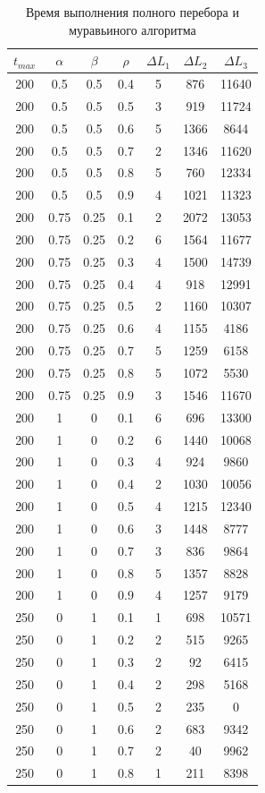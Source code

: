 \documentclass[a4paper,oneside,14pt]{extreport}
\begin{document}
\begin{table}[H]
\begin{center}
	\caption[]{\label{tbl:only} Время выполнения полного перебора и муравьиного алгоритма}
	\begin{tabular}{|c|c|c|c|c|c|c|}
		\hline
		$t_{max}$ & $\alpha$ & $\beta$&$\rho$ &$\Delta L_{1}$ & $\Delta L_{2}$ & $\Delta L_{3}$\\
		\hline
		200 & 0.5 & 0.5 & 0.4 & 5 & 876 & 11640 \\
		200 & 0.5 & 0.5 & 0.5 & 3 & 919 & 11724 \\
		200 & 0.5 & 0.5 & 0.6 & 5 & 1366 & 8644 \\
		200 & 0.5 & 0.5 & 0.7 & 2 & 1346 & 11620 \\
		200 & 0.5 & 0.5 & 0.8 & 5 & 760 & 12334 \\
		200 & 0.5 & 0.5 & 0.9 & 4 & 1021 & 11323 \\
		200 & 0.75 & 0.25 & 0.1 & 2 & 2072 & 13053 \\
		200 & 0.75 & 0.25 & 0.2 & 6 & 1564 & 11677 \\
		200 & 0.75 & 0.25 & 0.3 & 4 & 1500 & 14739 \\
		200 & 0.75 & 0.25 & 0.4 & 4 & 918 & 12991 \\
		200 & 0.75 & 0.25 & 0.5 & 2 & 1160 & 10307 \\
		200 & 0.75 & 0.25 & 0.6 & 4 & 1155 & 4186 \\
		200 & 0.75 & 0.25 & 0.7 & 5 & 1259 & 6158 \\
		200 & 0.75 & 0.25 & 0.8 & 5 & 1072 & 5530 \\
		200 & 0.75 & 0.25 & 0.9 & 3 & 1546 & 11670 \\
		200 & 1 & 0 & 0.1 & 6 & 696 & 13300 \\
		200 & 1 & 0 & 0.2 & 6 & 1440 & 10068 \\
		200 & 1 & 0 & 0.3 & 4 & 924 & 9860 \\
		200 & 1 & 0 & 0.4 & 2 & 1030 & 10056 \\
		200 & 1 & 0 & 0.5 & 4 & 1215 & 12340 \\
		200 & 1 & 0 & 0.6 & 3 & 1448 & 8777 \\
		200 & 1 & 0 & 0.7 & 3 & 836 & 9864 \\
		200 & 1 & 0 & 0.8 & 5 & 1357 & 8828 \\
		200 & 1 & 0 & 0.9 & 4 & 1257 & 9179 \\
		250 & 0 & 1 & 0.1 & 1 & 698 & 10571 \\
		250 & 0 & 1 & 0.2 & 2 & 515 & 9265 \\
		250 & 0 & 1 & 0.3 & 2 & 92 & 6415 \\
		250 & 0 & 1 & 0.4 & 2 & 298 & 5168 \\
		250 & 0 & 1 & 0.5 & 2 & 235 & 0 \\
		250 & 0 & 1 & 0.6 & 2 & 683 & 9342 \\
		250 & 0 & 1 & 0.7 & 2 & 40 & 9962 \\
		250 & 0 & 1 & 0.8 & 1 & 211 & 8398 \\
		\hline	
	\end{tabular}
\end{center}
\end{table}
\end{document}
